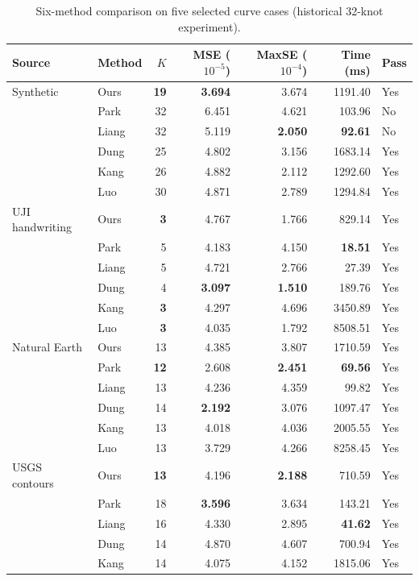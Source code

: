 \documentclass{article}
\begin{document}
\begin{table}[htbp]\centering\small
\caption{Six-method comparison on five selected curve cases (historical 32-knot experiment).}
\label{tab:selected-cases}
\begin{tabular}{llrrrrl}
\toprule
Source & Method & $K$ & MSE ($10^{-5}$) & MaxSE ($10^{-4}$) & Time (ms) & Pass \\
\midrule
Synthetic & Ours & \textbf{19} & \textbf{3.694} & 3.674 & 1191.40 & Yes \\
 & Park & 32 & 6.451 & 4.621 & 103.96 & No \\
 & Liang & 32 & 5.119 & \textbf{2.050} & \textbf{92.61} & No \\
 & Dung & 25 & 4.802 & 3.156 & 1683.14 & Yes \\
 & Kang & 26 & 4.882 & 2.112 & 1292.60 & Yes \\
 & Luo & 30 & 4.871 & 2.789 & 1294.84 & Yes \\
\midrule
UJI handwriting & Ours & \textbf{3} & 4.767 & 1.766 & 829.14 & Yes \\
 & Park & 5 & 4.183 & 4.150 & \textbf{18.51} & Yes \\
 & Liang & 5 & 4.721 & 2.766 & 27.39 & Yes \\
 & Dung & 4 & \textbf{3.097} & \textbf{1.510} & 189.76 & Yes \\
 & Kang & \textbf{3} & 4.297 & 4.696 & 3450.89 & Yes \\
 & Luo & \textbf{3} & 4.035 & 1.792 & 8508.51 & Yes \\
\midrule
Natural Earth & Ours & 13 & 4.385 & 3.807 & 1710.59 & Yes \\
 & Park & \textbf{12} & 2.608 & \textbf{2.451} & \textbf{69.56} & Yes \\
 & Liang & 13 & 4.236 & 4.359 & 99.82 & Yes \\
 & Dung & 14 & \textbf{2.192} & 3.076 & 1097.47 & Yes \\
 & Kang & 13 & 4.018 & 4.036 & 2005.55 & Yes \\
 & Luo & 13 & 3.729 & 4.266 & 8258.45 & Yes \\
\midrule
USGS contours & Ours & \textbf{13} & 4.196 & \textbf{2.188} & 710.59 & Yes \\
 & Park & 18 & \textbf{3.596} & 3.634 & 143.21 & Yes \\
 & Liang & 16 & 4.330 & 2.895 & \textbf{41.62} & Yes \\
 & Dung & 14 & 4.870 & 4.607 & 700.94 & Yes \\
 & Kang & 14 & 4.075 & 4.152 & 1815.06 & Yes \\

\end{tabular}
\end{table}
\end{document}
